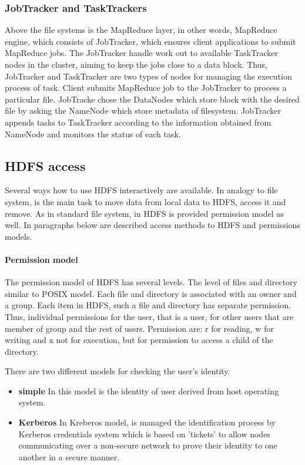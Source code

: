 \documentclass[a4paper,12pt,oneside]{report}
\begin{document}
\subsubsection{JobTracker and TaskTrackers}
Above the file systems is  the MapReduce layer, in other words, MapReduce engine, which consists of 
JobTracker,  which ensures client applications to submit MapReduce jobs. The JobTracker handle work 
out to available TaskTracker nodes in the cluster, 
aiming to keep the jobs close to a data block.  Thus, JobTracker and TaskTracker are two types of 
nodes for managing the execution process of  task.
Client submits MapReduce job  to the JobTracker to process a particular file. JobTracke chose the 
DataNodes which store block with the desired file by asking the NameNode which store metadata of filesystem. 
JobTracker appends tasks to TaskTracker according to the  information obtained from NameNode and monitors the status of each task.


\subsection{HDFS access} %
Several ways how to use HDFS interactively are available. In analogy to file system,  is  the main task to move data from local data to HDFS, access it and remove. As in standard file system, in HDFS is provided permission model as well. In paragraphs below are described access methods to HDFS and permissions models.

\paragraph{Permission model}
The permission model of HDFS has several levels. The level of files and directory similar to POSIX model. Each file and directory is associated with an owner and a group. Each item in HDFS, such a file and directory has separate permission. Thus, individual permissions for the user, that is a user, for other users that are member of group and the rest of users. Permission are: r for reading, w for writing and x not for execution, but for permission to access a child of the directory.\cite{permission}

There are two different models for checking the user's identity.
\begin{itemize}
\item \textbf{simple}  In this model is the identity of user derived from host operating system.
\item \textbf{Kerberos} In Kreberos model, is managed the identification process by Kerberos credentials system which is based on 'tickets' to allow nodes communicating over a non-secure network to prove their identity to one another in a secure manner.\cite{kerberos}
\end{itemize}
\end{document}
